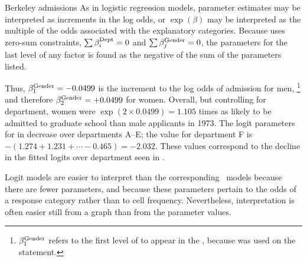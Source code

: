 \begin{Example}[berkeley7]{Berkeley admissions}
As in logistic regression models, parameter estimates may be interpreted
as increments in the log odds, or $\exp(\beta)$ may be interpreted
as the multiple of the odds associated with the explanatory categories.
Because  uses zero-sum constraints,
$\sum \beta_i^{\mbox{\scriptsize   Dept}} =0$ and
$\sum \beta_j^{\mbox{\scriptsize   Gender}} =0$, the parameters for the
last level of any factor
is found as the negative of the sum of the parameters listed.

Thus, $\beta_1^{\mbox{\scriptsize   Gender}} = -0.0499$
is the increment to the log odds of admission for men,%
\footnote{$\beta_1^{\mbox{\scriptsize   Gender}}$ refers to
the first level of  to appear in the 
\Dset, because  was used on the  statement.}
and therefore $\beta_2^{\mbox{\scriptsize Gender}} = +0.0499$ for women.
Overall, but controlling for department, women were $\exp(2 \times 0.0499) = 1.105$
times as likely to be admitted to graduate school than male applicants
in 1973.
The logit parameters for  in  decrease
over departments A--E; the value for department F is $-(1.274 + 1.231 + \cdots
-0.465) = -2.032$.
These values correspond to the decline in the fitted logits
over department seen in .

Logit models are easier to interpret than the corresponding \loglin\
models because there are fewer parameters,
and because these parameters pertain to the odds of a response category
rather than to cell frequency.
Nevertheless, interpretation is often easier still from a graph than from the
parameter values.
\end{Example}
